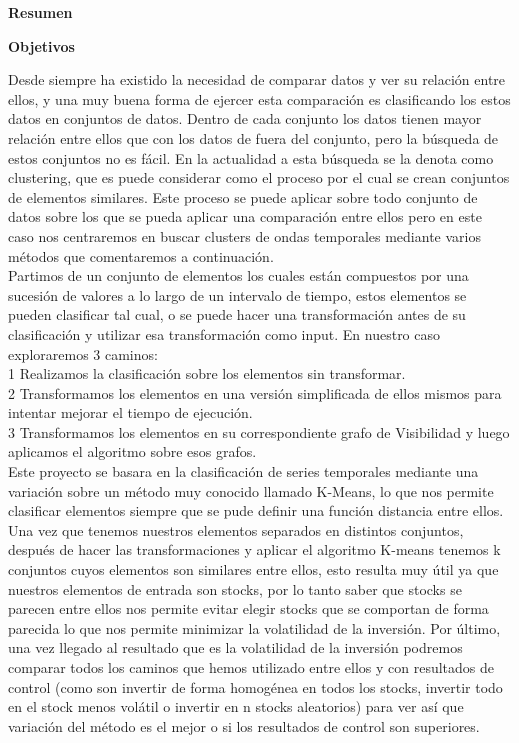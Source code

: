 \documentclass[12pt, letterpaper, twoside]{article}
\begin{document}
	\vspace{1cm}
	{\bfseries\large Resumen \par}
	\vspace{1cm}
		{\bfseries\normalsize Objetivos \par}
Desde siempre ha existido la necesidad de comparar datos y ver su relación entre ellos, y una muy buena forma de ejercer esta comparación es clasificando los estos datos en conjuntos de datos. Dentro de cada conjunto los datos tienen mayor relación entre ellos que con los datos de fuera del conjunto, pero la búsqueda de estos conjuntos no es fácil. En la actualidad a esta búsqueda se la denota como clustering, que es puede considerar como el proceso por el cual se crean conjuntos de elementos similares. Este proceso se puede aplicar sobre todo conjunto de datos sobre los que se pueda aplicar una comparación entre ellos pero en este caso nos centraremos en buscar clusters de ondas temporales mediante varios métodos que comentaremos a continuación.\\
Partimos de un conjunto de elementos los cuales están compuestos por una sucesión de valores a lo largo de un intervalo de tiempo, estos elementos se pueden clasificar tal cual, o se puede hacer una transformación antes de su clasificación y utilizar esa transformación como input. En nuestro caso exploraremos 3 caminos:\\
1 Realizamos la clasificación sobre los elementos sin transformar.\\
2 Transformamos los elementos en una versión simplificada de ellos mismos para intentar mejorar el tiempo de ejecución.\\
3 Transformamos los elementos en su correspondiente grafo de Visibilidad y luego aplicamos el algoritmo sobre esos grafos.\\
Este proyecto se basara en la clasificación de series temporales mediante una variación sobre un método muy conocido llamado K-Means, lo que nos permite clasificar elementos siempre que se pude definir una función distancia entre ellos.\\
Una vez que tenemos nuestros elementos separados en distintos conjuntos, después de hacer las transformaciones y aplicar el algoritmo K-means tenemos k conjuntos cuyos elementos son similares entre ellos, esto resulta muy útil ya que nuestros elementos de entrada son stocks, por lo tanto saber que stocks se parecen entre ellos nos permite evitar elegir stocks que se comportan de forma parecida lo que nos permite minimizar la volatilidad de la inversión.
Por último, una vez llegado al resultado que es la volatilidad de la inversión podremos comparar todos los caminos que hemos utilizado entre ellos y con resultados de control (como son invertir de forma homogénea en todos los stocks, invertir todo en el stock menos volátil o invertir en n stocks aleatorios) para ver así que variación del método es el mejor o si los resultados de control son superiores.\\
\end{document}
